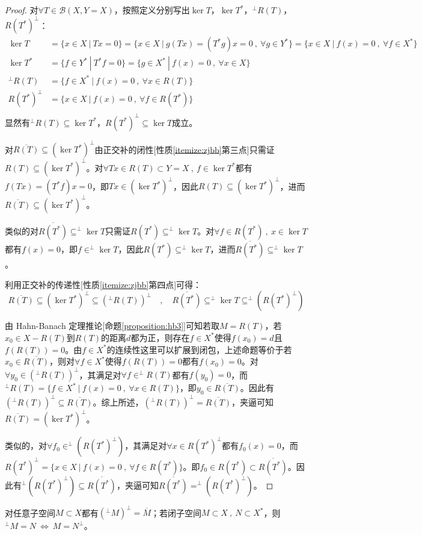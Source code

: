 \begin{proof}
对$\forall T \in \mathscr{B}(X,Y=X)$，按照定义分别写出$\ker T$，$\ker T^*$，$^{\perp}R(T)$，$R(T^*)^{\perp}$：
\[\begin{aligned}
\ker T         &= \{x \in X \ | \ Tx=0\}=\{x \in X \ | \ g(Tx)=(T^*g)x=0 \ , \ \forall g \in Y^*\}=\{x \in X \ | \ f(x)=0 \ , \ \forall f \in X^*\}\\
\ker T^*       &= \{f \in Y^* \ | \ T^*f=0\}=\{g \in X^* \ | \ f(x)=0 \ , \ \forall x \in X\}\\
^{\perp}R(T)   &= \{f \in X^* \ | \ f(x)=0 \ , \ \forall x \in R(T)\}\\
R(T^*)^{\perp} &= \{x \in X \ | \ f(x)=0 \ , \ \forall f \in R(T^*)\}\\
\end{aligned}\]
显然有$^{\perp}R(T) \subseteq \ker T^*$，$R(T^*)^{\perp} \subseteq \ker T$成立。

对$\overline{R(T)} \subseteq (\ker T^*)^{\perp}$由正交补的闭性[性质\ref{itemize:zjbb}第三点]只需证$R(T) \subseteq (\ker T^*)^{\perp}$。对$\forall Tx \in R(T) \subset Y=X \ , \ f \in \ker T^*$都有$f(Tx)=(T^*f)x=0$，即$Tx \in (\ker T^*)^{\perp}$，因此$R(T) \subseteq (\ker T^*)^{\perp}$，进而$\overline{R(T)} \subseteq (\ker T^*)^{\perp}$。

类似的对$\overline{R(T^*)} \subseteq ^{\perp}\ker T$只需证$R(T^*) \subseteq ^{\perp}\ker T$。对$\forall f \in R(T^*) \ , \ x \in \ker T$都有$f(x)=0$，即$f \in ^{\perp}\ker T$，因此$R(T^*) \subseteq ^{\perp}\ker T$，进而$\overline{R(T^*)} \subseteq ^{\perp}\ker T$。

利用正交补的传递性[性质\ref{itemize:zjbb}第四点]可得：
\[\overline{R(T)} \subseteq (\ker T^*)^{\perp} \subseteq (^{\perp}R(T))^{\perp} \quad , \quad \overline{R(T^*)} \subseteq ^{\perp}\ker T \subseteq ^{\perp}(R(T^*)^{\perp})\]

由 Hahn-Banach 定理推论[命题\ref{proposition:hb3}]可知若取$M=R(T)$，若$x_0 \in X-R(T)$到$R(T)$的距离$d$都为正，则存在$f \in X^*$使得$f(x_0)=d$且$f(R(T))=0$。由$f \in X^*$的连续性这里可以扩展到闭包，上述命题等价于若$x_0 \in \overline{R(T)}$，则对$\forall f \in X^*$使得$f(R(T))=0$都有$f(x_0)=0$。对$\forall y_0 \in (^{\perp}R(T))^{\perp}$，其满足对$\forall f \in ^{\perp}R(T)$都有$f(y_0)=0$，而$^{\perp}R(T)=\{f \in X^* \ | \ f(x)=0 \ , \ \forall x \in R(T)\}$，即$y_0 \in \overline{R(T)}$。因此有$(^{\perp}R(T))^{\perp} \subseteq \overline{R(T)}$。综上所述，$(^{\perp}R(T))^{\perp}=\overline{R(T)}$，夹逼可知$\overline{R(T)}=(\ker T^*)^{\perp}$。

类似的，对$\forall f_0 \in ^{\perp}(R(T^*)^{\perp})$，其满足对$\forall x \in R(T^*)^{\perp}$都有$f_0(x)=0$，而$R(T^*)^{\perp}=\{x \in X \ | \ f(x)=0 \ , \ \forall f \in R(T^*)\}$。即$f_0 \in R(T^*) \subset \overline{R(T^*)}$。因此有$^{\perp}(R(T^*)^{\perp}) \subseteq \overline{R(T^*)}$，夹逼可知$\overline{R(T^*)}=^{\perp}(R(T^*)^{\perp})$。
\end{proof}
\begin{remark}
\quad 对任意子空间$M \subset X$都有$(^{\perp}M)^{\perp}=\overline{M}$；若闭子空间$M \subset X \ , \ N \subset X^*$，则$^{\perp}M=N \ \Leftrightarrow \ M=N^{\perp}$。
\end{remark}


